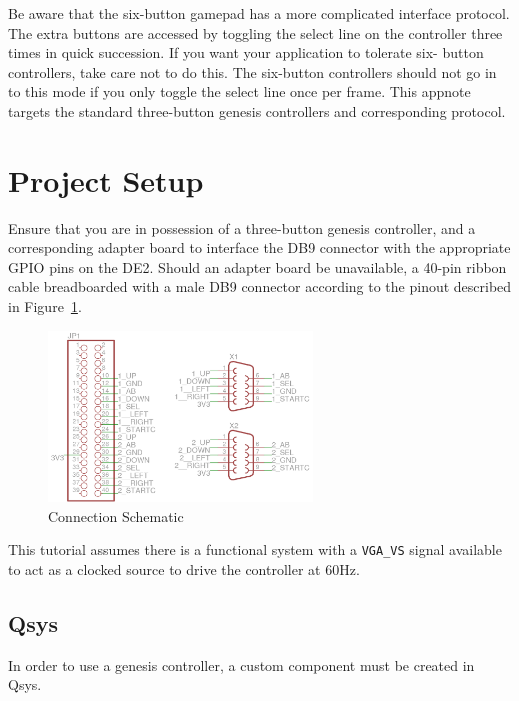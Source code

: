\documentclass{capstonedoc}
\begin{document}
Be aware that the six-button gamepad has a more complicated interface protocol.
The extra buttons are accessed by toggling the select line on the controller
three times in quick succession. If you want your application to tolerate six-
button controllers, take care not to do this. The six-button controllers should
not go in to this mode if you only toggle the select line once per frame.
This appnote targets the standard three-button genesis controllers and 
corresponding protocol.

\section{Project Setup}
Ensure that you are in possession of a three-button genesis controller, and a 
corresponding adapter board to interface the DB9 connector with the appropriate 
GPIO pins on the DE2. Should an adapter board be unavailable, a 40-pin ribbon 
cable breadboarded with a male DB9 connector according to the pinout described 
in Figure~\ref{fig:schematic}.

\begin{figure}[h]
  \centering
  \includegraphics[width=7cm]{schematic}
  \caption{Connection Schematic}
  \label{fig:schematic}
\end{figure}

This tutorial assumes there is a functional system with a \texttt{VGA\_VS}
signal available to act as a clocked source to drive the controller at 60Hz. 

\subsection{Qsys}

In order to use a genesis controller, a custom component must be created in Qsys.
\end{document}
